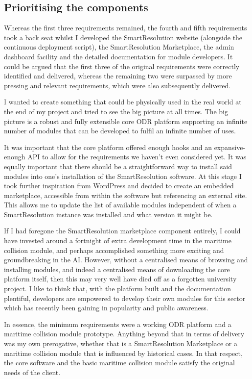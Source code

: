 \subsection{Prioritising the components}

Whereas the first three requirements remained, the fourth and fifth requirements took a back seat whilst I developed the SmartResolution website (alongside the continuous deployment script), the SmartResolution Marketplace, the admin dashboard facility and the detailed documentation for module developers. It could be argued that the first three of the original requirements were correctly identified and delivered, whereas the remaining two were surpassed by more pressing and relevant requirements, which were also subsequently delivered.

I wanted to create something that could be physically used in the real world at the end of my project and tried to see the big picture at all times. The big picture is a robust and fully extensible core ODR platform supporting an infinite number of modules that can be developed to fulfil an infinite number of uses.

It was important that the core platform offered enough hooks and an expansive-enough API to allow for the requirements we haven't even considered yet. It was equally important that there should be a straightforward way to install said modules into one's installation of the SmartResolution software. At this stage I took further inspiration from WordPress and decided to create an embedded marketplace, accessible from within the software but referencing an external site. This allows me to update the list of available modules independent of when a SmartResolution instance was installed and what version it might be.

If I had foregone the SmartResolution marketplace component entirely, I could have invested around a fortnight of extra development time in the maritime collision module, and perhaps accomplished something more exciting and groundbreaking in the AI. However, without a centralised means of browsing and installing modules, and indeed a centralised means of downloading the core platform itself, then this may very well have died off as a forgotten university project. I like to think that, with the platform built and the documentation plentiful, developers are empowered to develop their own modules for this sector which has recently been gaining in popularity and public awareness.

In essence, the minimum requirements were a working ODR platform and a maritime collision module prototype. Anything beyond that in terms of delivery was my own prerogative, whether that is a SmartResolution Marketplace or a maritime collision module that is influenced by historical cases. In that respect, the core software and the basic maritime collision module satisfy the original needs of the client.

